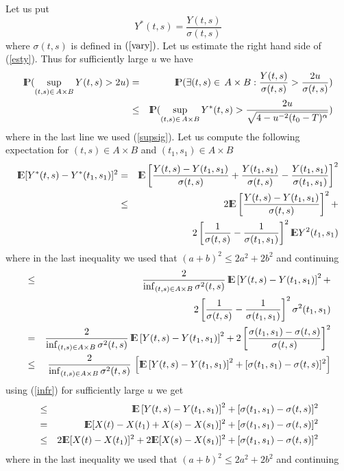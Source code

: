 Let us put 
$$
Y^{*}(t,s)=\frac{Y(t,s)}{\sigma(t,s)}
$$
where $\sigma(t,s)$ is defined in $(\ref{vary})$.
Let us estimate the right hand side of (\ref{esty}). Thus for sufficiently large $u$ we have
\begin{eqnarray}
{\rm I\hspace{-0.8mm}P}(\sup_{(t,s)\in\,A\times B} Y(t,s)>2u)&=&
{\rm I\hspace{-0.8mm}P}(\exists (t,s)\in\,A\times B: \frac{Y(t,s)}{\sigma(t,s)}>\frac{2u}{\sigma(t,s)})\nonumber\\
&\leq & {\rm I\hspace{-0.8mm}P}(\sup_{(t,s)\in\,A\times B} Y^{*}(t,s)>\frac{2u}{\sqrt{4-u^{-2}(t_0-T)^\alpha}})
\label{supy}
\end{eqnarray}
where in the last line we used (\ref{supsig}).
Let us compute the following expectation for $(t,s)\in A\times B$ and $(t_1,s_1)\in A\times B$
\begin{eqnarray*}
{\rm I\hspace{-0.8mm}E}[Y^{*}(t,s)-Y^{*}(t_1,s_1)]^2&=&{\rm I\hspace{-0.8mm}E}\left[\frac{Y(t,s)-Y(t_1,s_1)}{\sigma(t,s)}+\frac{Y(t_1,s_1)}{\sigma(t,s)}
-\frac{Y(t_1,s_1)}{\sigma(t_1,s_1)}\right]^2\\
&\leq & 2{\rm I\hspace{-0.8mm}E}\left[\frac{Y(t,s)-Y(t_1,s_1)}{\sigma(t,s)}\right]^2+\\
&&
\,\,\,\,\,\,\,2\left[\frac{1}{\sigma(t,s)}-\frac{1}{\sigma(t_1,s_1)}\right]^2
{\rm I\hspace{-0.8mm}E} Y^2(t_1,s_1)
\end{eqnarray*}
where in the last inequality we used that $(a+b)^2\leq 2a^2+2b^2$ and continuing 
\begin{eqnarray*}
&\leq &\frac{2}{\inf_{(t,s)\in A\times B}\sigma^2(t,s)}\,{\rm I\hspace{-0.8mm}E}\left[Y(t,s)-Y(t_1,s_1)\right]^2+\\
&&
\,\,\,\,\,\,\,\,\,\,\,\,\,\,\,\,\,\,2\left[\frac{1}{\sigma(t,s)}-\frac{1}{\sigma(t_1,s_1)}\right]^2
\sigma^2(t_1,s_1)\\
&=&
\frac{2}{\inf_{(t,s)\in A\times B}\sigma^2(t,s)}\,{\rm I\hspace{-0.8mm}E}\left[Y(t,s)-Y(t_1,s_1)\right]^2+
2\left[\frac{\sigma(t_1,s_1)-\sigma(t,s)}{\sigma(t,s)}\right]^2\\
&\leq & \frac{2}{\inf_{(t,s)\in A\times B}\sigma^2(t,s)}\,
\left[{\rm I\hspace{-0.8mm}E}\left[Y(t,s)-Y(t_1,s_1)\right]^2+[\sigma(t_1,s_1)-\sigma(t,s)]^2\right]
\end{eqnarray*}
using (\ref{infr}) for sufficiently large $u$ we get
\begin{eqnarray*}
&\leq & {\rm I\hspace{-0.8mm}E}\left[Y(t,s)-Y(t_1,s_1)\right]^2+[\sigma(t_1,s_1)-\sigma(t,s)]^2\\
&=& {\rm I\hspace{-0.8mm}E}[X(t)-X(t_1)+X(s)-X(s_1)]^2+[\sigma(t_1,s_1)-\sigma(t,s)]^2\\
&\leq & 2{\rm I\hspace{-0.8mm}E}[X(t)-X(t_1)]^2+2{\rm I\hspace{-0.8mm}E}[X(s)-X(s_1)]^2+[\sigma(t_1,s_1)-\sigma(t,s)]^2
\end{eqnarray*}
where in the last inequality we used that $(a+b)^2\leq 2a^2+2b^2$ and continuing 
